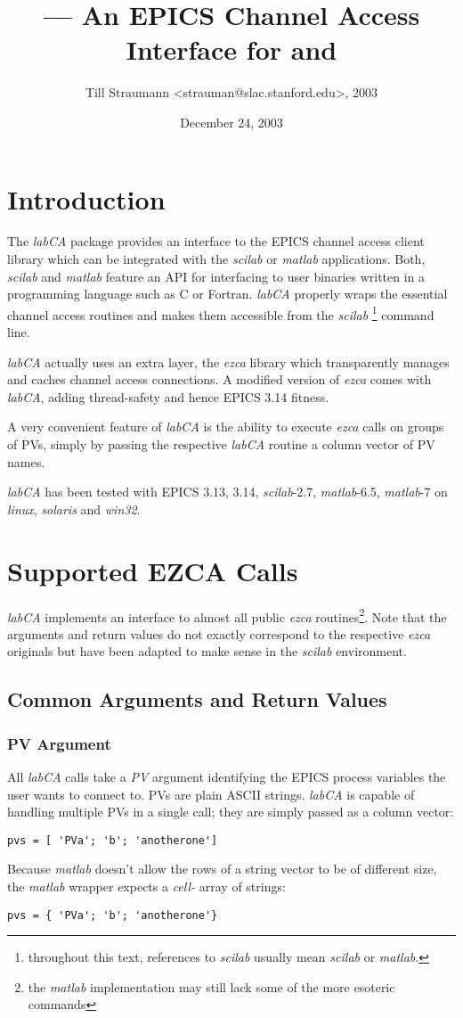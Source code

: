 \documentclass{article}
\title{\sca{} --- An EPICS Channel Access Interface for \scilab{} and \matlab{}}
\author{Till Straumann <strauman@slac.stanford.edu>, 2003}
\date{December 24, 2003}
\newcommand{\sca}{\ita{labCA}}
\newcommand{\scilab}{\ita{scilab}}
\newcommand{\matlab}{\ita{matlab}}
\newcommand{\windoze}{\ita{win32}}
\newcommand{\ezca}{\ita{ezca}}
\newcommand{\ita}[1]{\emph{#1}}
\begin{document}
\maketitle
{\hspace*{\fill}{\small\verb$Id: manual.tex,v 1.7 2004/01/01 01:12:40 till Exp $}\hspace*{\fill}}
\section{Introduction}
The \sca{} package provides an interface to the
EPICS channel access client library which can be
integrated with the \scilab{} or \matlab{} applications.
Both, \scilab{} and \matlab{} feature an API for interfacing
to user binaries written in a programming language such
as C or Fortran. \sca{} properly wraps the essential
channel access routines and makes them accessible
from the \scilab%
\footnote{throughout this text, references to \scilab{}
usually mean \scilab{} or \matlab.}
command line.

\sca{} actually uses an extra layer, the \ezca{} library
which transparently manages and caches channel access 
connections. A modified version of \ezca{} comes with
\sca, adding thread-safety and hence EPICS 3.14 fitness.

A very convenient feature of \sca{} is the ability
to execute \ezca{} calls on groups of PVs, simply by
passing the respective \sca{} routine a column vector
of PV names.

\sca{} has been tested with EPICS 3.13, 3.14, \scilab-2.7,
\matlab-6.5, \matlab-7 on \ita{linux}, \ita{solaris} and
\windoze.

\section{Supported EZCA Calls}
\sca{} implements an interface to almost all public
\ezca{} routines\footnote{%
the \matlab{} implementation may still lack some of the
more esoteric commands}. Note that the arguments and
return values do not exactly correspond to the respective
\ezca{} originals but have been adapted to make sense
in the  \scilab{} environment.

\subsection{Common Arguments and Return Values}
\subsubsection{PV Argument}
All \sca{} calls take a \ita{PV} argument identifying
the EPICS process variables the user wants to connect to.
PVs are plain ASCII strings. \sca{} is capable of handling
multiple PVs in a single call; they are simply passed as a
column vector:
\begin{verbatim}
pvs = [ 'PVa'; 'b'; 'anotherone']
\end{verbatim}
Because \matlab{} doesn't allow the rows of
a string vector to be of different size, the \matlab{}
wrapper expects a \ita{cell-} array of strings:
\begin{verbatim}
pvs = { 'PVa'; 'b'; 'anotherone'}
\end{verbatim}
\end{document}
